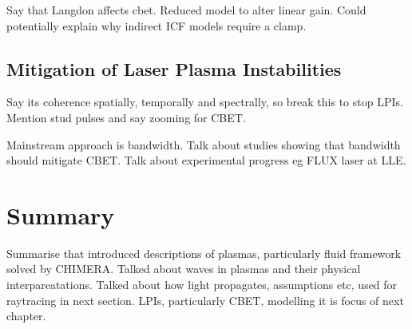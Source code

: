 Say that Langdon affects cbet.
Reduced model to alter linear gain.
Could potentially explain why indirect ICF models require a clamp.

\subsection{Mitigation of Laser Plasma Instabilities}%
\label{sec:theory_lpi_mitigation}

Say its coherence spatially, temporally and spectrally, so break this to stop LPIs.
Mention stud pulses and say zooming for CBET.

Mainstream approach is bandwidth.
Talk about studies showing that bandwidth should mitigate CBET.
Talk about experimental progress eg FLUX laser at LLE.


\section{Summary}%
\label{sec:theory_summary}

Summarise that introduced descriptions of plasmas, particularly fluid framework solved by CHIMERA.
Talked about waves in plasmas and their physical interpareatations.
Talked about how light propagates, assumptions etc, used for raytracing in next section.
LPIs, particularly CBET, modelling it is focus of next chapter.

